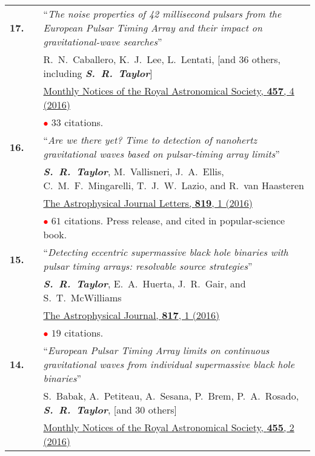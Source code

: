 \documentclass[11pt,letterpaper,sans]{moderncv}
\begin{document}
{\begin{longtable}{rp{0.3cm}p{15.8cm}}
\textbf{17.} & & ``\textit{The noise properties of 42 millisecond pulsars from the European Pulsar Timing Array and their impact on gravitational-wave searches}'' \\ 
&& R.~N.~Caballero, K.~J.~Lee, L.~Lentati, [and 36 others, including \textit{\textbf{S.~R.~Taylor}}] \\ 
&&  \href{http://mnras.oxfordjournals.org/content/457/4/4421}{{\color{color1} Monthly Notices of the Royal Astronomical Society, \textbf{457}, 4 (2016)}} \\
&& \textcolor{red}{$\bullet$} $33$ citations. \vspace{0.09cm}\\
\textbf{16.} & & ``\textit{Are we there yet? Time to detection of nanohertz gravitational waves based on pulsar-timing array limits}'' \\ 
&& \textit{\textbf{S.~R.~Taylor}}, M.~Vallisneri, J.~A.~Ellis, C.~M.~F.~Mingarelli, T.~J.~W.~Lazio, and R.~van Haasteren \\ 
&&  \href{http://iopscience.iop.org/article/10.3847/2041-8205/819/1/L6/meta}{{\color{color1} The Astrophysical Journal Letters, \textbf{819}, 1 (2016)}} \\
&& \textcolor{red}{$\bullet$} $61$ citations. Press release, and cited in popular-science book. \vspace{0.09cm}\\
\textbf{15.} & & ``\textit{Detecting eccentric supermassive black hole binaries with pulsar timing arrays: resolvable source strategies}'' \\ 
&& \textit{\textbf{S.~R.~Taylor}}, E.~A.~Huerta, J.~R.~Gair, and S.~T.~McWilliams \\ 
&& \href{http://iopscience.iop.org/article/10.3847/0004-637X/817/1/70/meta}{{\color{color1} The Astrophysical Journal, \textbf{817}, 1 (2016)}} \\
&& \textcolor{red}{$\bullet$} $19$ citations. \vspace{0.09cm}\\
\textbf{14.} & & ``\textit{European Pulsar Timing Array limits on continuous gravitational waves from individual supermassive black hole binaries}'' \\ 
&& S.~Babak, A.~Petiteau, A.~Sesana, P.~Brem, P.~A.~Rosado, \textit{\textbf{S.~R.~Taylor}}, [and 30 others] \\ 
&& \href{http://mnras.oxfordjournals.org/content/455/2/1665}{{\color{color1} Monthly Notices of the Royal Astronomical Society, \textbf{455}, 2 (2016)}} \\

\end{longtable}}
\end{document}

